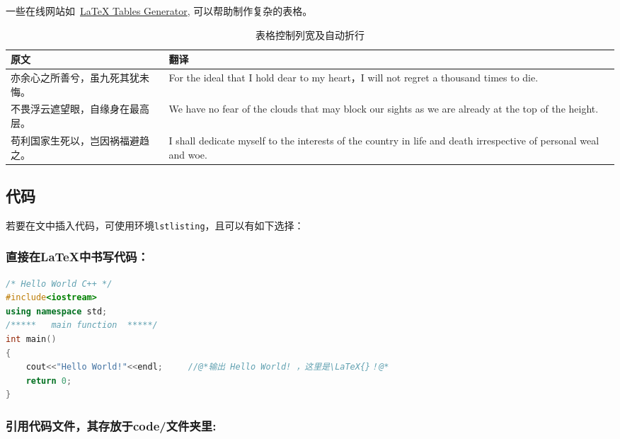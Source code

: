         一些在线网站如~\href{http://www.tablesgenerator.com}{LaTeX Tables Generator},
		可以帮助制作复杂的表格。
        \begin{table}[H]
            \centering
            \caption{表格控制列宽及自动折行}
            \label{tab:tabularx}
            \begin{tabularx}{0.8\textwidth}{p{7.5em}X}
                \toprule
                原文 & 翻译\\
                \midrule
                亦余心之所善兮，虽九死其犹未悔。 & For the ideal that I hold dear to my heart，I will not regret a thousand times to die.\\
                \hline
                不畏浮云遮望眼，自缘身在最高层。 & We have no fear of the clouds that may block our sights as we are already at the top of the height.\\
                \hline
                苟利国家生死以，岂因祸福避趋之。 & I shall dedicate myself to the interests of the country in life and death irrespective of personal weal and woe.\\
                \bottomrule
            \end{tabularx}
        \end{table}

    \subsection{代码}\label{subsec:code}
        若要在文中插入代码，可使用环境\texttt{lstlisting}，且可以有如下选择：
        \subsubsection{直接在\LaTeX{}中书写代码：}
            \begin{lstlisting}[language=C++,caption=Hello World!,label=code:HelloWorld]
/* Hello World C++ */
#include<iostream>
using namespace std;
/*****   main function	*****/
int main()
{
    cout<<"Hello World!"<<endl;		//@*输出 Hello World! ，这里是\LaTeX{}！@*
    return 0;
}
            \end{lstlisting}
        \subsubsection{引用代码文件，其存放于\textsf{code/}文件夹里:}
            
        

